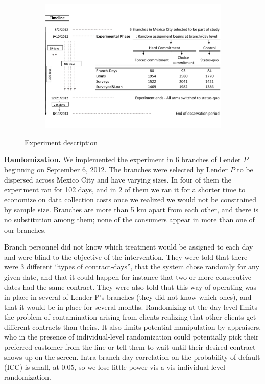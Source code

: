 \documentclass[ecta,nameyear,final]{econsocart}
\begin{document}
\begin{figure}     
\begin{center}
\begin{subfigure}{\textwidth}
        \includegraphics[width=\textwidth]{Figuras/consort.pdf}
    \end{subfigure}
  \end{center}
 \caption{Experiment description}
     \label{exp_description}
\end{figure}


\vspace{.2in}
\noindent \textbf{Randomization.}  We implemented the experiment in 6 branches of Lender $P$ beginning on September 6, 2012. The branches were selected by Lender $P$ to be dispersed across Mexico City and have varying sizes. In four of them the experiment ran for 102 days, and in 2 of them we ran it for a shorter time to economize on data collection costs once we realized we would not be constrained by sample size. %
Branches are more than 5 km apart from each other, and there is no substitution among them; none of the consumers appear in more than one of our branches.

Branch personnel did not know which treatment would be assigned to each day and were blind to the objective of the intervention. They were told that there were 3 different ``types of contract-days'', that the system chose randomly for any given date, and that it could happen for instance that two or more consecutive dates had the same contract. They were also told that this way of operating was in place in several of Lender P's branches (they did not know which ones), and that it would be in place for several months. Randomizing at the day level limits the problem of contamination arising from clients realizing that other clients get different contracts than theirs. It also limits potential manipulation by appraisers, who in the presence of individual-level randomization could potentially pick their preferred customer from the line or tell them to wait until their desired contract shows up on the screen. Intra-branch day correlation on the probability of default (ICC) is small, at {0.05}, so we lose little power vis-a-vis individual-level randomization.
\end{document}
